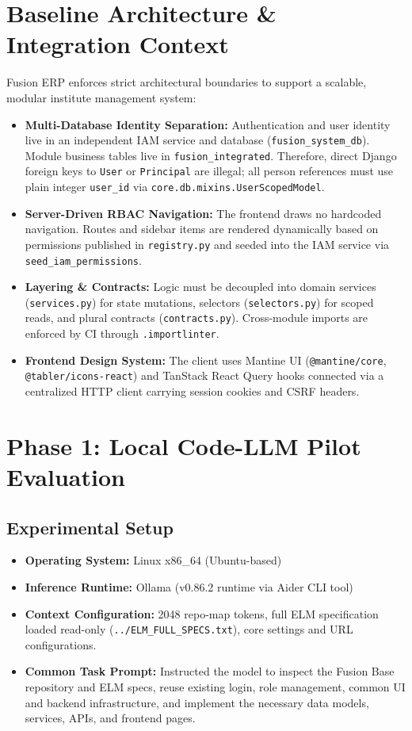 \documentclass[11pt,a4paper]{article}
\begin{document}
\section{Baseline Architecture \& Integration Context}
Fusion ERP enforces strict architectural boundaries to support a scalable, modular institute management system:
\begin{itemize}[noitemsep,topsep=2pt]
    \item \textbf{Multi-Database Identity Separation:} Authentication and user identity live in an independent IAM service and database (\texttt{fusion\_system\_db}). Module business tables live in \texttt{fusion\_integrated}. Therefore, direct Django foreign keys to \texttt{User} or \texttt{Principal} are illegal; all person references must use plain integer \texttt{user\_id} via \texttt{core.db.mixins.UserScopedModel}.
    \item \textbf{Server-Driven RBAC Navigation:} The frontend draws no hardcoded navigation. Routes and sidebar items are rendered dynamically based on permissions published in \texttt{registry.py} and seeded into the IAM service via \texttt{seed\_iam\_permissions}.
    \item \textbf{Layering \& Contracts:} Logic must be decoupled into domain services (\texttt{services.py}) for state mutations, selectors (\texttt{selectors.py}) for scoped reads, and plural contracts (\texttt{contracts.py}). Cross-module imports are enforced by CI through \texttt{.importlinter}.
    \item \textbf{Frontend Design System:} The client uses Mantine UI (\texttt{@mantine/core}, \texttt{@tabler/icons-react}) and TanStack React Query hooks connected via a centralized HTTP client carrying session cookies and CSRF headers.
\end{itemize}

\section{Phase 1: Local Code-LLM Pilot Evaluation}

\subsection{Experimental Setup}
\begin{itemize}[noitemsep,topsep=2pt]
    \item \textbf{Operating System:} Linux x86\_64 (Ubuntu-based)
    \item \textbf{Inference Runtime:} Ollama (v0.86.2 runtime via Aider CLI tool)
    \item \textbf{Context Configuration:} 2048 repo-map tokens, full ELM specification loaded read-only (\texttt{../ELM\_FULL\_SPECS.txt}), core settings and URL configurations.
    \item \textbf{Common Task Prompt:} Instructed the model to inspect the Fusion Base repository and ELM specs, reuse existing login, role management, common UI and backend infrastructure, and implement the necessary data models, services, APIs, and frontend pages.
\end{itemize}
\end{document}
